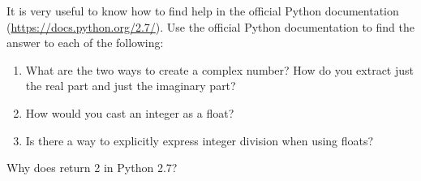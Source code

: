\begin{problem}
It is very useful to know how to find help in the official Python documentation  (\url{https://docs.python.org/2.7/}). Use the official Python documentation to find the answer to each of the following:

\begin{enumerate}

\item What are the two ways to create a complex number? 
How do you extract just the real part and just the imaginary part?
\item How would you cast an integer as a float?
\item Is there a way to explicitly express integer division when using floats?
\end{enumerate}
\end{problem}

\begin{problem}
Why does  return 2 in Python 2.7? 
\end{problem}

